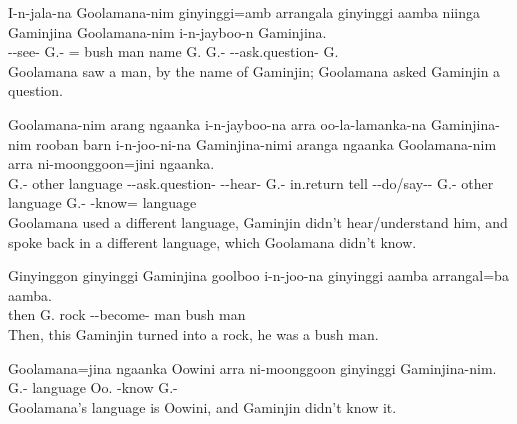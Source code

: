 \begin{exye}
\newpage\exy {}
\gll I-n-jala-na            Goolamana-nim       ginyinggi=amb       arrangala ginyinggi  aamba niinga  Gaminjina Goolamana-nim       i-n-jayboo-n          Gaminjina.\\
--see- G.- = bush         man   name   G.        G.- --ask.question- G.\\
\glt  Goolamana saw a man, by the name of Gaminjin; Goolamana asked Gaminjin a question.

\exy {}
\gll Goolamana-nim       arang  ngaanka  i-n-jayboo-na            arra      oo-la-lamanka-na            Gaminjina-nim       rooban     barn  i-n-joo-ni-na            Gaminjina-nimi       aranga  ngaanka  Goolamana-nim       arra      ni-moonggoon=jini         ngaanka.\\
G.- other  language --ask.question-  --hear- G.- in.return  tell  --do/say-- G.- other  language G.-  -know= language\\
\glt  Goolamana used a different language, Gaminjin didn't hear/understand him, and spoke back in a different language, which Goolamana didn't know.%

\exy {}
\gll Ginyinggon ginyinggi  Gaminjina goolboo i-n-joo-na            ginyinggi  aamba arrangal=ba  aamba.\\
then        G.  rock    --become-  man   bush man\\
\glt  Then, this Gaminjin turned into a rock, he was a bush man.

\newpage\exy {}
\gll Goolamana=jina           ngaanka  Oowini arra      ni-moonggoon ginyinggi  Gaminjina-nim.\\
G.- language Oo.     -know       G.-\\
\glt  Goolamana's language is Oowini, and Gaminjin didn't know it.


\end{exye}
